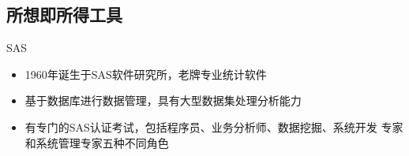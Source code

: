 \documentclass{beamerthemeMono}
\begin{document}
\subsection{所想即所得工具}
\begin{frame}[t]{\subsecname}{SAS}
  \begin{itemize}
    \item<1-> 1960年诞生于SAS软件研究所，老牌专业统计软件
    \item<2-> 基于数据库进行数据管理，具有大型数据集处理分析能力
    \item<3-> 有专门的SAS认证考试，包括程序员、业务分析师、数据挖掘、系统开发
           专家和系统管理专家五种不同角色
  \end{itemize}
  
  \begin{overlayarea} {\textwidth}{\textheight}
  \end{overlayarea}
\end{frame}
\end{document}
